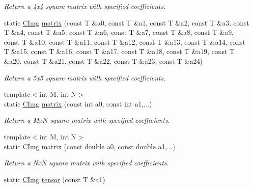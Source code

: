 \begin{DoxyCompactItemize}
\begin{DoxyCompactList}\small\item\em Return a 4x4 square matrix with specified coefficients. \end{DoxyCompactList}\item 
\hypertarget{structcimg__library_1_1_c_img_a558286cb9bbf335ec664cf8f7b32245f}{static \hyperlink{structcimg__library_1_1_c_img}{C\-Img} \hyperlink{structcimg__library_1_1_c_img_a558286cb9bbf335ec664cf8f7b32245f}{matrix} (const T \&a0, const T \&a1, const T \&a2, const T \&a3, const T \&a4, const T \&a5, const T \&a6, const T \&a7, const T \&a8, const T \&a9, const T \&a10, const T \&a11, const T \&a12, const T \&a13, const T \&a14, const T \&a15, const T \&a16, const T \&a17, const T \&a18, const T \&a19, const T \&a20, const T \&a21, const T \&a22, const T \&a23, const T \&a24)}\label{structcimg__library_1_1_c_img_a558286cb9bbf335ec664cf8f7b32245f}

\begin{DoxyCompactList}\small\item\em Return a 5x5 square matrix with specified coefficients. \end{DoxyCompactList}\item 
\hypertarget{structcimg__library_1_1_c_img_af1c89be47094b6fe2bd8d6dfb503f167}{{\footnotesize template$<$int M, int N$>$ }\\static \hyperlink{structcimg__library_1_1_c_img}{C\-Img} \hyperlink{structcimg__library_1_1_c_img_af1c89be47094b6fe2bd8d6dfb503f167}{matrix} (const int a0, const int a1,...)}\label{structcimg__library_1_1_c_img_af1c89be47094b6fe2bd8d6dfb503f167}

\begin{DoxyCompactList}\small\item\em Return a Mx\-N square matrix with specified coefficients. \end{DoxyCompactList}\item 
\hypertarget{structcimg__library_1_1_c_img_a79f2311d031ded9057ea008238025f58}{{\footnotesize template$<$int M, int N$>$ }\\static \hyperlink{structcimg__library_1_1_c_img}{C\-Img} \hyperlink{structcimg__library_1_1_c_img_a79f2311d031ded9057ea008238025f58}{matrix} (const double a0, const double a1,...)}\label{structcimg__library_1_1_c_img_a79f2311d031ded9057ea008238025f58}

\begin{DoxyCompactList}\small\item\em Return a Nx\-N square matrix with specified coefficients. \end{DoxyCompactList}\item 
\hypertarget{structcimg__library_1_1_c_img_a40bd4344f4a7aae588ef5bfa4f8861d1}{static \hyperlink{structcimg__library_1_1_c_img}{C\-Img} \hyperlink{structcimg__library_1_1_c_img_a40bd4344f4a7aae588ef5bfa4f8861d1}{tensor} (const T \&a1)}\label{structcimg__library_1_1_c_img_a40bd4344f4a7aae588ef5bfa4f8861d1}


\end{DoxyCompactItemize}
